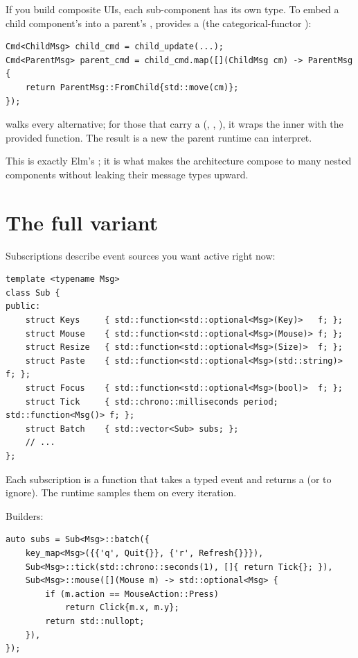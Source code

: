 If you build composite UIs, each sub-component has its own
 type. To embed a child component's 
into a parent's ,  provides a
 (the categorical-functor ):

\begin{lstlisting}
Cmd<ChildMsg> child_cmd = child_update(...);
Cmd<ParentMsg> parent_cmd = child_cmd.map([](ChildMsg cm) -> ParentMsg {
    return ParentMsg::FromChild{std::move(cm)};
});
\end{lstlisting}

 walks every alternative; for those that carry a 
(, , ), it wraps the
inner  with the provided function. The result is a new
 the parent runtime can interpret.

This is exactly Elm's ; it is what makes the
architecture compose to many nested components without leaking
their message types upward.

\section{The full  variant}

Subscriptions describe event sources you want active right now:

\begin{lstlisting}
template <typename Msg>
class Sub {
public:
    struct Keys     { std::function<std::optional<Msg>(Key)>   f; };
    struct Mouse    { std::function<std::optional<Msg>(Mouse)> f; };
    struct Resize   { std::function<std::optional<Msg>(Size)>  f; };
    struct Paste    { std::function<std::optional<Msg>(std::string)> f; };
    struct Focus    { std::function<std::optional<Msg>(bool)>  f; };
    struct Tick     { std::chrono::milliseconds period; std::function<Msg()> f; };
    struct Batch    { std::vector<Sub> subs; };
    // ...
};
\end{lstlisting}

Each subscription is a function that takes a typed event and
returns a  (or  to ignore). The runtime
samples them on every iteration.

Builders:

\begin{lstlisting}
auto subs = Sub<Msg>::batch({
    key_map<Msg>({{'q', Quit{}}, {'r', Refresh{}}}),
    Sub<Msg>::tick(std::chrono::seconds(1), []{ return Tick{}; }),
    Sub<Msg>::mouse([](Mouse m) -> std::optional<Msg> {
        if (m.action == MouseAction::Press)
            return Click{m.x, m.y};
        return std::nullopt;
    }),
});
\end{lstlisting}

